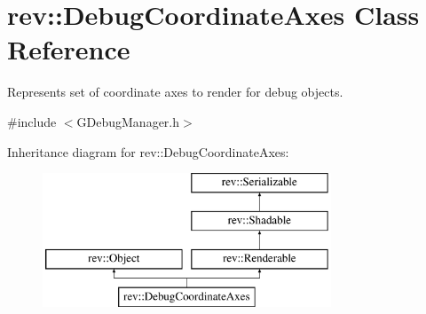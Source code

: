 \hypertarget{classrev_1_1_debug_coordinate_axes}{}\section{rev\+::Debug\+Coordinate\+Axes Class Reference}
\label{classrev_1_1_debug_coordinate_axes}


Represents set of coordinate axes to render for debug objects.  




{\ttfamily \#include $<$G\+Debug\+Manager.\+h$>$}

Inheritance diagram for rev\+::Debug\+Coordinate\+Axes\+:\begin{figure}[H]
\begin{center}
\leavevmode
\includegraphics[height=4.000000cm]{classrev_1_1_debug_coordinate_axes}
\end{center}
\end{figure}
